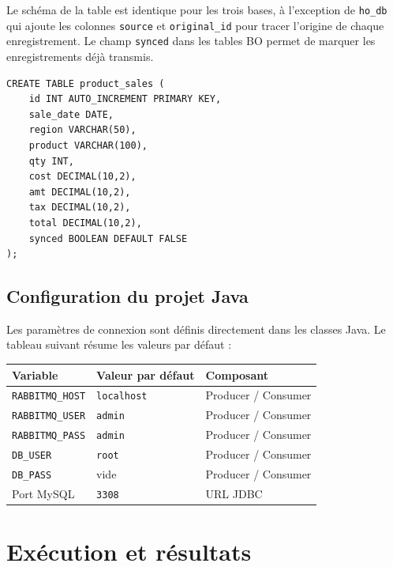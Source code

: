 \documentclass[a4paper,12pt]{article}
\begin{document}
Le schéma de la table est identique pour les trois bases, à l'exception de \texttt{ho\_db} qui ajoute les colonnes \texttt{source} et \texttt{original\_id} pour tracer l'origine de chaque enregistrement. Le champ \texttt{synced} dans les tables BO permet de marquer les enregistrements déjà transmis.

\begin{lstlisting}[style=sql, caption={Structure de la table product\_sales dans les BOs}]
CREATE TABLE product_sales (
    id INT AUTO_INCREMENT PRIMARY KEY,
    sale_date DATE,
    region VARCHAR(50),
    product VARCHAR(100),
    qty INT,
    cost DECIMAL(10,2),
    amt DECIMAL(10,2),
    tax DECIMAL(10,2),
    total DECIMAL(10,2),
    synced BOOLEAN DEFAULT FALSE
);
\end{lstlisting}

\subsection{Configuration du projet Java}

Les paramètres de connexion sont définis directement dans les classes Java. Le tableau suivant résume les valeurs par défaut :

\begin{center}
\begin{tabular}{|l|l|l|}
\hline
\textbf{Variable} & \textbf{Valeur par défaut} & \textbf{Composant} \\
\hline
\texttt{RABBITMQ\_HOST} & \texttt{localhost} & Producer / Consumer \\
\texttt{RABBITMQ\_USER} & \texttt{admin} & Producer / Consumer \\
\texttt{RABBITMQ\_PASS} & \texttt{admin} & Producer / Consumer \\
\texttt{DB\_USER} & \texttt{root} & Producer / Consumer \\
\texttt{DB\_PASS} & vide & Producer / Consumer \\
Port MySQL & \texttt{3308} & URL JDBC \\
\hline
\end{tabular}
\end{center}

\section{Exécution et résultats}
\end{document}
